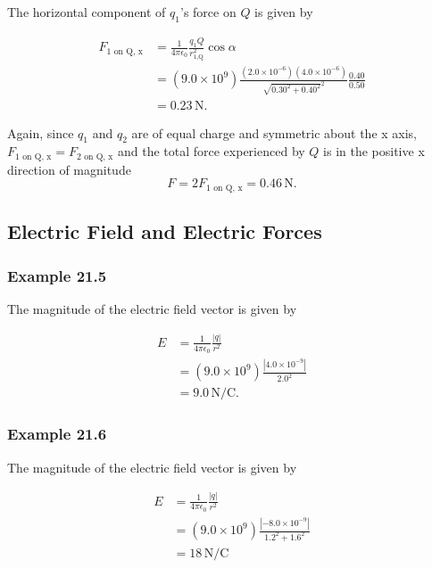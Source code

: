 \documentclass{article}
\begin{document}
The horizontal component of $q_1$'s force on $Q$ is given by

\begin{align*}
  F_\textrm{1 on Q, x} & = \frac{1}{4\pi\epsilon_0} \frac{q_1Q}{r_\textrm{1,Q}^2} \cos\alpha                                             \\
                       & = (9.0 \times 10^9) \frac{(2.0 \times 10^{-6})(4.0 \times 10^{-6})}{\sqrt{0.30^2 + 0.40^2}^2} \frac{0.40}{0.50} \\
                       & = 0.23\,\textrm{N}.
\end{align*}

Again, since $q_1$ and $q_2$ are of equal charge and symmetric about the x axis, $F_\textrm{1 on Q, x} = F_\textrm{2 on Q, x}$ and the total force experienced by $Q$ is in the positive x direction of magnitude \[F = 2F_\textrm{1 on Q, x} = 0.46\,\textrm{N}.\]

\subsection{Electric Field and Electric Forces}

\subsubsection{Example 21.5}

The magnitude of the electric field vector is given by

\begin{align*}
  E & = \frac{1}{4\pi\epsilon_0} \frac{|q|}{r^2}             \\
    & = (9.0 \times 10^9) \frac{|4.0 \times 10^{-9}|}{2.0^2} \\
    & = 9.0\,\textrm{N}/\textrm{C}.
\end{align*}

\subsubsection{Example 21.6}

The magnitude of the electric field vector is given by

\begin{align*}
  E & = \frac{1}{4\pi\epsilon_0} \frac{|q|}{r^2}                      \\
    & = (9.0 \times 10^9) \frac{|-8.0 \times 10^{-9}|}{1.2^2 + 1.6^2} \\
    & = 18\,\textrm{N}/\textrm{C}
\end{align*}
\end{document}
